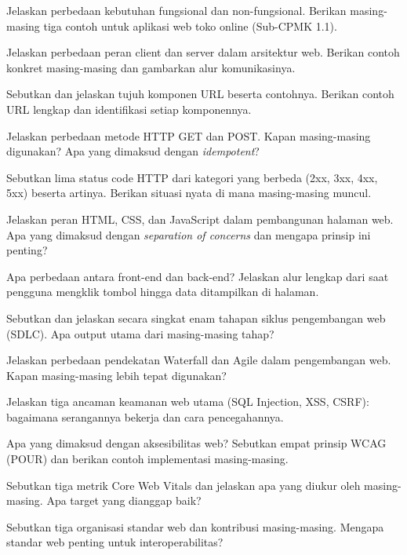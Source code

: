 \documentclass[../main.tex]{subfiles}
\begin{document}
\begin{latihan}
  \item Jelaskan perbedaan kebutuhan fungsional dan non-fungsional. Berikan masing-masing tiga contoh untuk aplikasi web toko online (Sub-CPMK 1.1).
  \item Jelaskan perbedaan peran client dan server dalam arsitektur web. Berikan contoh konkret masing-masing dan gambarkan alur komunikasinya.
  \item Sebutkan dan jelaskan tujuh komponen URL beserta contohnya. Berikan contoh URL lengkap dan identifikasi setiap komponennya.
  \item Jelaskan perbedaan metode HTTP GET dan POST. Kapan masing-masing digunakan? Apa yang dimaksud dengan \textit{idempotent}?
  \item Sebutkan lima status code HTTP dari kategori yang berbeda (2xx, 3xx, 4xx, 5xx) beserta artinya. Berikan situasi nyata di mana masing-masing muncul.
  \item Jelaskan peran HTML, CSS, dan JavaScript dalam pembangunan halaman web. Apa yang dimaksud dengan \textit{separation of concerns} dan mengapa prinsip ini penting?
  \item Apa perbedaan antara front-end dan back-end? Jelaskan alur lengkap dari saat pengguna mengklik tombol hingga data ditampilkan di halaman.
  \item Sebutkan dan jelaskan secara singkat enam tahapan siklus pengembangan web (SDLC). Apa output utama dari masing-masing tahap?
  \item Jelaskan perbedaan pendekatan Waterfall dan Agile dalam pengembangan web. Kapan masing-masing lebih tepat digunakan?
  \item Jelaskan tiga ancaman keamanan web utama (SQL Injection, XSS, CSRF): bagaimana serangannya bekerja dan cara pencegahannya.
  \item Apa yang dimaksud dengan aksesibilitas web? Sebutkan empat prinsip WCAG (POUR) dan berikan contoh implementasi masing-masing.
  \item Sebutkan tiga metrik Core Web Vitals dan jelaskan apa yang diukur oleh masing-masing. Apa target yang dianggap baik?
  \item Sebutkan tiga organisasi standar web dan kontribusi masing-masing. Mengapa standar web penting untuk interoperabilitas?
\end{latihan}
\end{document}
